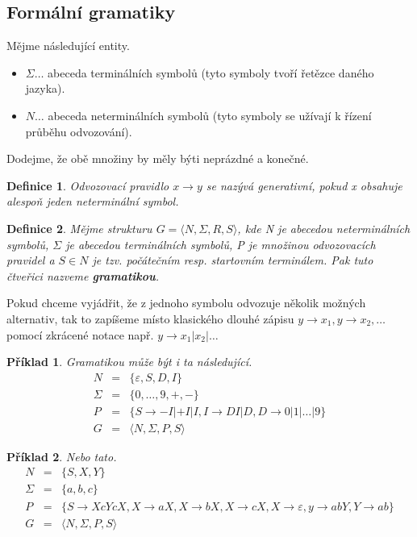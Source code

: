 \documentclass[10pt, a4paper, titlepage]{article}
\theoremstyle{note}
\newtheorem{definice}{\textbf{Definice}}
\newtheorem{priklad}{\textbf{Příklad}}
\begin{document}
\subsection{Formální gramatiky}
Mějme následující entity.
\begin{itemize}
\item $\Sigma \ldots$ abeceda terminálních symbolů (tyto symboly tvoří řetězce daného jazyka).
\item $N \ldots$ abeceda neterminálních symbolů (tyto symboly se užívají k řízení průběhu odvozování).
\end{itemize}

Dodejme, že obě množiny by měly býti neprázdné a konečné.

\begin{definice}
Odvozovací pravidlo $x \rightarrow y$ se nazývá \emph{generativní}, pokud \emph{x} obsahuje alespoň jeden neterminální symbol.
\end{definice}

\begin{definice}
Mějme strukturu $G = \langle N, \Sigma, R, S \rangle$, kde \emph{N} je abecedou neterminálních symbolů, $\Sigma$ je abecedou terminálních symbolů,
\emph{P} je množinou odvozovacích pravidel a $S \in N$ je tzv. počátečním resp. startovním terminálem. Pak tuto čtveřici nazveme \textbf{gramatikou}.
\end{definice}

Pokud chceme vyjádřit, že z jednoho symbolu odvozuje několik možných alternativ, tak to zapíšeme místo klasického dlouhé zápisu
$y \rightarrow x_{1}, y \rightarrow x_{2}, \ldots$ pomocí zkrácené notace např. $y \rightarrow x_{1}|x_{2}|\ldots$

\begin{priklad}
Gramatikou může být i ta následující.
\begin{eqnarray*}
N &=& \lbrace \varepsilon, S, D, I \rbrace \\
\Sigma &=& \lbrace 0, \ldots, 9, +, - \rbrace \\
P &=& \lbrace S \rightarrow -I|+I|I, I \rightarrow DI|D, D \rightarrow 0|1|\ldots |9 \rbrace \\
G &=& \langle N, \Sigma, P, S \rangle
\end{eqnarray*}
\end{priklad}

\begin{priklad}
Nebo tato.
\begin{eqnarray*}\label{priklad-2}
N &=& \lbrace S, X, Y \rbrace \\
\Sigma &=& \lbrace a, b, c \rbrace \\
P &=& \lbrace S \rightarrow XcYcX, X \rightarrow aX, X \rightarrow bX, X \rightarrow cX, X \rightarrow \varepsilon,
y \rightarrow abY, Y \rightarrow ab \rbrace \\
G &=& \langle N, \Sigma, P, S \rangle
\end{eqnarray*}
\end{priklad}
\end{document}
